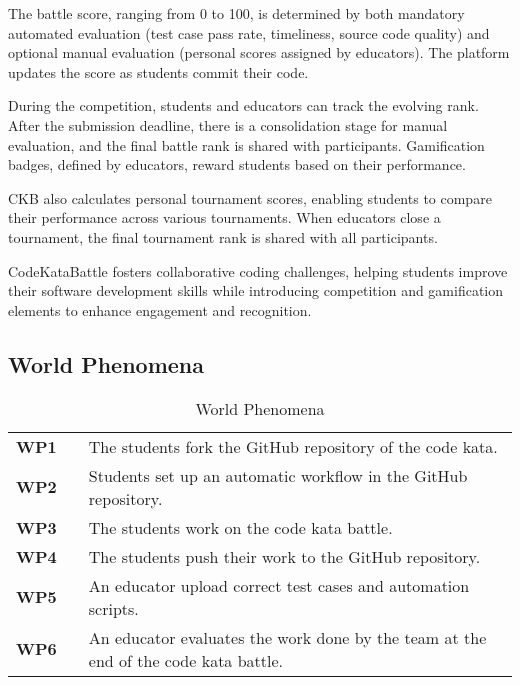 The battle score, ranging from 0 to 100, is determined by both mandatory automated evaluation (test case pass rate, timeliness, source code quality) and optional manual evaluation (personal scores assigned by educators). 
The platform updates the score as students commit their code.

During the competition, students and educators can track the evolving rank. 
After the submission deadline, there is a consolidation stage for manual evaluation, and the final battle rank is shared with participants. 
Gamification badges, defined by educators, reward students based on their performance.

CKB also calculates personal tournament scores, enabling students to compare their performance across various tournaments. 
When educators close a tournament, the final tournament rank is shared with all participants.

CodeKataBattle fosters collaborative coding challenges, helping students improve their software development skills while introducing competition and gamification elements to enhance engagement and recognition.

\subsection{World Phenomena}

\begin{table}[H]
    \centering
    \renewcommand{\arraystretch}{1.5} 
    \begin{tabular}{l l p{12cm}}
    \hline
        \textbf{WP1} & & The students fork the GitHub repository of the code kata. \\                                                                                                
        \textbf{WP2} & & Students set up an automatic workflow in the GitHub repository. \\ 
        \textbf{WP3} & & The students work on the code kata battle. \\
        \textbf{WP4} & & The students push their work to the GitHub repository. \\
        \textbf{WP5} & & An educator upload correct test cases and automation scripts. \\
        \textbf{WP6} & & An educator evaluates the work done by the team at the end of the code kata battle. \\
    \hline
    \end{tabular}
    \caption{World Phenomena}
\end{table}

